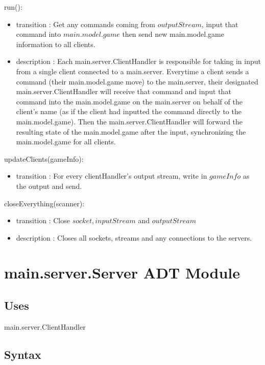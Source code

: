 \documentclass[12pt, titlepage]{article}
\begin{document}
        \noindent run():
        \begin{itemize}
        \item transition : Get any commands coming from $outputStream$, input that command into $main.model.game$ then send new main.model.game information to all clients.
        \item description : Each main.server.ClientHandler is responsible for taking in input from a single client connected to a main.server. Everytime a client sends a command (their main.model.game move) to the main.server, their designated main.server.ClientHandler will receive that command and input that command into the main.model.game on the main.server on behalf of the client's name (as if the client had inputted the command directly to the main.model.game). Then the main.server.ClientHandler will forward the resulting state of the main.model.game after the input, synchronizing the main.model.game for all clients.
        \end{itemize}
        
        \noindent updateClients(gameInfo):
        \begin{itemize}
        \item transition : For every clientHandler's output stream, write in $gameInfo$ as the output and send.
        \end{itemize}
        
        \noindent closeEverything(scanner):
        \begin{itemize}
        \item transition : Close $socket, inputStream$ and $outputStream$
        \item description : Closes all sockets,  streams and any connections to the servers.
        \end{itemize}
        
        
                        
        
\section* {main.server.Server ADT Module}
    \subsection* {Uses}
    main.server.ClientHandler
    \subsection* {Syntax}
    
\end{document}
